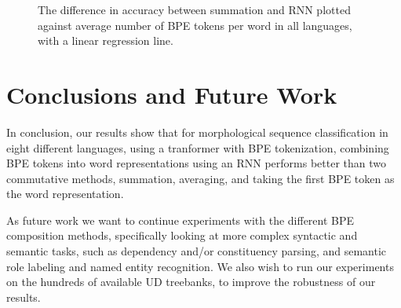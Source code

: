 \documentclass[11pt]{article}
\begin{document}
\begin{figure}
        \caption{The difference in accuracy between summation and RNN plotted against average number of BPE
     tokens per word in all languages, with a linear regression line.}
    \label{fig:scatter_len}
    \end{figure}

    \section{Conclusions and Future Work}


    
    In conclusion, our results show that for morphological
     sequence classification in eight different languages, using a
     tranformer with BPE tokenization, combining BPE tokens into word representations
     using an RNN performs better than two commutative methods,
     summation, averaging, and taking the first BPE token as the word
     representation.
    
    As future work we want to continue experiments with the different
    BPE composition methods, specifically looking at more complex
    syntactic and semantic tasks, such as dependency and/or
    constituency parsing, and semantic role labeling and named entity recognition.
        We also wish to run our experiments on the hundreds
     of available UD treebanks, to improve the robustness of our
     results.  
    

	
	
	
\end{document}
